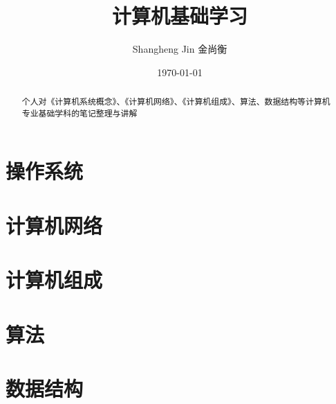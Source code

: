 \documentclass{article}
\title{计算机基础学习}
\author{Shangheng Jin 金尚衡}
\date{\today}
\begin{document}
    \maketitle
    \begin{abstract}
        \small\centering 个人对《计算机系统概念》、《计算机网络》、《计算机组成》、算法、数据结构等计算机专业基础学科的笔记整理与讲解
    \end{abstract}
    \tableofcontents
    \section{操作系统}
        
        
    \section{计算机网络}
    \section{计算机组成}
    \section{算法}
    \section{数据结构}
\end{document}
